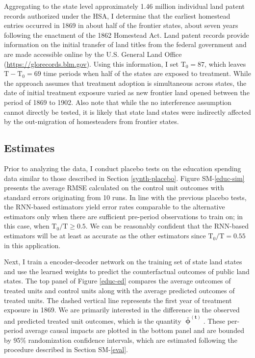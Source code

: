 Aggregating to the state level approximately 1.46 million individual land patent records authorized under the HSA, I determine that the earliest homestead entries occurred in 1869 in about half of the frontier states, about seven years following the enactment of the 1862 Homestead Act. Land patent records provide information on the initial transfer of land titles from the federal government and are made accessible online by the U.S. General Land Office (\url{https://glorecords.blm.gov}). Using this information, I set $\text{T}_0 = 87$, which leaves $\text{T} - \text{T}_0 = 69$ time periods when half of the states are exposed to treatment. While the approach assumes that treatment adoption is simultaneous across states, the date of initial treatment exposure varied as new frontier land opened between the period of 1869 to 1902. Also note that while the no interference assumption cannot directly be tested, it is likely that state land states were indirectly affected by the out-migration of homesteaders from frontier states. 

\subsection{Estimates}

Prior to analyzing the data, I conduct placebo tests on the education spending data similar to those described in Section \ref{synth-placebo}. Figure SM-\ref{educ-sim} presents the average RMSE calculated on the control unit outcomes with standard errors originating from 10 runs. In line with the previous placebo tests, the RNN-based estimators yield error rates comparable to the alternative estimators only when there are sufficient pre-period observations to train on; in this case, when $\text{T}_0/\text{T} \geq 0.5$. We can be reasonably confident that the RNN-based estimators will be at least as accurate as the other estimators since $\text{T}_0/\text{T} = 0.55$ in this application. 

Next, I train a encoder-decoder network on the training set of state land states and use the learned weights to predict the counterfactual outcomes of public land states. The top panel of Figure \ref{educ-ed} compares the average outcomes of treated units and control units along with the average predicted outcomes of treated units. The dashed vertical line represents the first year of treatment exposure in 1869. We are primarily interested in the difference in the observed and predicted treated unit outcomes, which is the quantity $\boldsymbol{\bar{\upphi}^{(t)}}$. These per-period average causal impacts are plotted in the bottom panel and are bounded by 95\% randomization confidence intervals, which are estimated following the procedure described in Section SM-\ref{eval}. 

